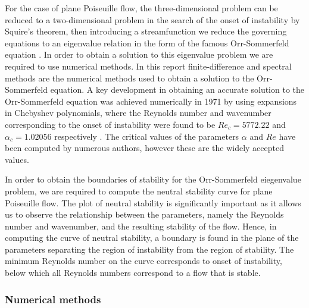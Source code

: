 \documentclass[a4paper, 12pt, twoside, openright]{article}
\numberwithin{equation}{section}
\begin{document}
For the case of plane Poiseuille flow, the three-dimensional problem can be reduced to a two-dimensional problem in the search of the onset of instability by Squire's theorem, then introducing a streamfunction we reduce the governing equations to an eigenvalue relation in the form of the famous Orr-Sommerfeld equation \citep{Squire33}. In order to obtain a solution to this eigenvalue problem we are required to use numerical methods. In this report finite-difference and spectral methods are the numerical methods used to obtain a solution to the Orr-Sommerfeld equation. A key development in obtaining an accurate solution to the Orr-Sommerfeld equation was achieved numerically in 1971 by using expansions in Chebyshev polynomials, where the Reynolds number and wavenumber corresponding to the onset of instability were found to be $Re_{c}=5772.22$ and $\alpha_{c}=1.02056$ respectively \citep{Orszag71}. The critical values of the parameters $\alpha$ and $Re$ have been computed by numerous authors, however these are the widely accepted values. %

In order to obtain the boundaries of stability for the Orr-Sommerfeld eiegenvalue problem, we are required to compute the neutral stability curve for plane Poiseuille flow. The plot of neutral stability is significantly important as it allows us to observe the relationship between the parameters, namely the Reynolds number and wavenumber, and the resulting stability of the flow. Hence, in computing the curve of neutral stability, a boundary is found in the plane of the parameters separating the region of instability from the region of stability. The minimum Reynolds number on the curve corresponds to onset of instability, below which all Reynolds numbers correspond to a flow that is stable. %

%    
%
%
%

% 
\subsubsection{Numerical methods}
\end{document}
